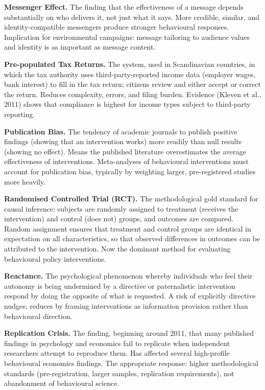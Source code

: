 \documentclass[12pt, letterpaper]{article}
\begin{document}
\textbf{Messenger Effect.} The finding that the effectiveness of a message depends substantially on who delivers it, not just what it says. More credible, similar, and identity-compatible messengers produce stronger behavioural responses. Implication for environmental campaigns: message tailoring to audience values and identity is as important as message content.

\textbf{Pre-populated Tax Returns.} The system, used in Scandinavian countries, in which the tax authority uses third-party-reported income data (employer wages, bank interest) to fill in the tax return; citizens review and either accept or correct the return. Reduces complexity, errors, and filing burden. Evidence (Kleven et al., 2011) shows that compliance is highest for income types subject to third-party reporting.

\textbf{Publication Bias.} The tendency of academic journals to publish positive findings (showing that an intervention works) more readily than null results (showing no effect). Means the published literature overestimates the average effectiveness of interventions. Meta-analyses of behavioural interventions must account for publication bias, typically by weighting larger, pre-registered studies more heavily.

\textbf{Randomised Controlled Trial (RCT).} The methodological gold standard for causal inference: subjects are randomly assigned to treatment (receives the intervention) and control (does not) groups, and outcomes are compared. Random assignment ensures that treatment and control groups are identical in expectation on all characteristics, so that observed differences in outcomes can be attributed to the intervention. Now the dominant method for evaluating behavioural policy interventions.

\textbf{Reactance.} The psychological phenomenon whereby individuals who feel their autonomy is being undermined by a directive or paternalistic intervention respond by doing the opposite of what is requested. A risk of explicitly directive nudges; reduces by framing interventions as information provision rather than behavioural direction.

\textbf{Replication Crisis.} The finding, beginning around 2011, that many published findings in psychology and economics fail to replicate when independent researchers attempt to reproduce them. Has affected several high-profile behavioural economics findings. The appropriate response: higher methodological standards (pre-registration, larger samples, replication requirements), not abandonment of behavioural science.
\end{document}
